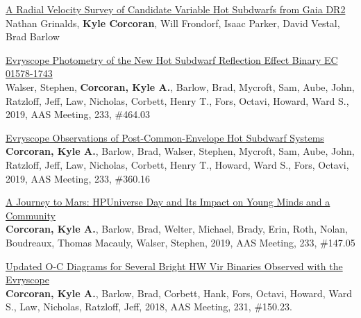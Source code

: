 \documentclass[letterpaper,12pt]{article}
\begin{document}
\vspace{3mm}
\noindent{}
\begin{etaremune}
\item \href{https://sdob9.sciencesconf.org/data/pages/book_sdob9_en_A5_v4.pdf}{\textcolor{rotundaorange}{A Radial Velocity Survey of Candidate Variable Hot Subdwarfs from Gaia DR2}}\\
Nathan Grinalds, \textbf{Kyle Corcoran}, Will Frondorf, Isaac Parker, David Vestal, Brad Barlow
\item \href{https://ui.adsabs.harvard.edu/abs/2019AAS...23346403W/abstract}{\textcolor{rotundaorange}{Evryscope Photometry of the New Hot Subdwarf Reflection Effect Binary EC 01578-1743}}\\
Walser, Stephen, \textbf{Corcoran, Kyle A.}, Barlow, Brad, Mycroft, Sam, Aube, John, Ratzloff, Jeff, Law, Nicholas, Corbett, Henry T., Fors, Octavi, Howard, Ward S., 2019, AAS Meeting, 233, \#464.03
\newpage
\item \href{https://ui.adsabs.harvard.edu/abs/2019AAS...23336016C/abstract}{\textcolor{rotundaorange}{Evryscope Observations of Post-Common-Envelope Hot Subdwarf Systems}}\\
\textbf{Corcoran, Kyle A.}, Barlow, Brad, Walser, Stephen, Mycroft, Sam, Aube, John, Ratzloff, Jeff, Law, Nicholas, Corbett, Henry T., Howard, Ward S., Fors, Octavi, 2019, AAS Meeting, 233, \#360.16
\item \href{https://ui.adsabs.harvard.edu/abs/2019AAS...23314705C/abstract}{\textcolor{rotundaorange}{A Journey to Mars: HPUniverse Day and Its Impact on Young Minds and a Community}}\\
\textbf{Corcoran, Kyle A.}, Barlow, Brad, Welter, Michael, Brady, Erin, Roth, Nolan, Boudreaux, Thomas Macauly,
Walser, Stephen, 2019, AAS Meeting, 233, \#147.05
\item \href{https://ui.adsabs.harvard.edu/abs/2018AAS...23115023C/abstract}{\textcolor{rotundaorange}{Updated O-C Diagrams for Several Bright HW Vir Binaries Observed with the Evryscope}}\\
\textbf{Corcoran, Kyle A.}, Barlow, Brad, Corbett, Hank, Fors, Octavi, Howard, Ward S., Law, Nicholas, Ratzloff, Jeff, 2018,
AAS Meeting, 231, \#150.23.
\end{etaremune}
\end{document}
